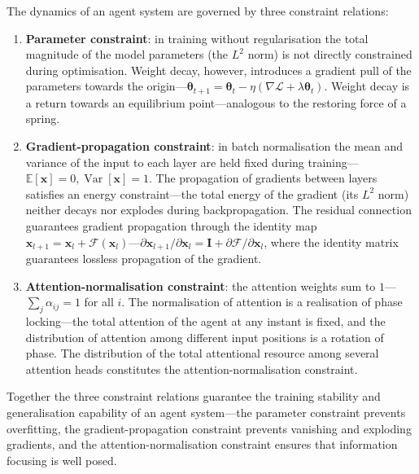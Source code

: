 \begin{theorem}\label{thm:agent_conservation}
The dynamics of an agent system are governed by three constraint relations:
\begin{enumerate}[label=(\roman*)]
    \item \textbf{Parameter constraint}: in training without regularisation the total magnitude of the model parameters (the $L^2$ norm) is not directly constrained during optimisation. Weight decay, however, introduces a gradient pull of the parameters towards the origin---$\boldsymbol{\theta}_{t+1} = \boldsymbol{\theta}_t - \eta(\nabla\mathcal{L} + \lambda \boldsymbol{\theta}_t)$. Weight decay is a return towards an equilibrium point---analogous to the restoring force of a spring.
    \item \textbf{Gradient-propagation constraint}: in batch normalisation the mean and variance of the input to each layer are held fixed during training---$\mathbb{E}[\mathbf{x}] = 0, \operatorname{Var}[\mathbf{x}] = 1$. The propagation of gradients between layers satisfies an energy constraint---the total energy of the gradient (its $L^2$ norm) neither decays nor explodes during backpropagation. The residual connection guarantees gradient propagation through the identity map $\mathbf{x}_{l+1} = \mathbf{x}_l + \mathcal{F}(\mathbf{x}_l)$---$\partial \mathbf{x}_{l+1}/\partial \mathbf{x}_l = \mathbf{I} + \partial \mathcal{F}/\partial \mathbf{x}_l$, where the identity matrix guarantees lossless propagation of the gradient.
    \item \textbf{Attention-normalisation constraint}: the attention weights sum to $1$---$\sum_j \alpha_{ij} = 1$ for all $i$. The normalisation of attention is a realisation of phase locking---the total attention of the agent at any instant is fixed, and the distribution of attention among different input positions is a rotation of phase. The distribution of the total attentional resource among several attention heads constitutes the attention-normalisation constraint.
\end{enumerate}
Together the three constraint relations guarantee the training stability and generalisation capability of an agent system---the parameter constraint prevents overfitting, the gradient-propagation constraint prevents vanishing and exploding gradients, and the attention-normalisation constraint ensures that information focusing is well posed.
\end{theorem}

